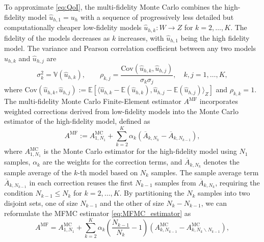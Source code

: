 To approximate \eqref{eq:QoI}, the multi-fidelity Monte Carlo combines the high-fidelity model $\widehat u_{h,1}=u_{h}$ with a sequence of progressively less detailed but computationally cheaper low-fidelity models $\widehat u_{h,k}: W \rightarrow Z$ for $k=2,\ldots,K$. The fidelity of the models decreases as $k$ increases, with $\widehat u_{h,1}$ being the high fidelity model. The variance and Pearson correlation coefficient between any two models $\widehat u_{h,k}$ and $\widehat u_{h,j}$ are
%
\begin{equation*}
    \sigma_k^2 = \mathbb{V}\left(\widehat u_{h,k}\right),\qquad \rho_{k,j} = \frac{\text{Cov}\left(\widehat u_{h,k},\widehat u_{h,j}\right)}{\sigma_k\sigma_j}, \quad k,j=1,\dots, K,
\end{equation*}
%
where $\text{Cov}(\widehat u_{h,k},\widehat u_{h,j}) := \mathbb{E}[\langle \widehat u_{h,k} - \mathbb{E}(\widehat u_{h,k}), \widehat u_{h,j} - \mathbb{E}(\widehat u_{h,j})\rangle_Z]$ and $\rho_{k,k}=1$.
The multi-fidelity Monte Carlo Finite-Element estimator $A^{\text{MF}}$ incorporates weighted corrections derived from low-fidelity models into the  Monte Carlo estimator of the high-fidelity model, defined as
%
\begin{equation}\label{eq:MFMC_estimator}
    A^{\text{MF}} := A^{\text{MC}}_{1,N_1} + \sum_{k=2}^K \alpha_k\left(\overline{A}_{k,N_k} - \overline{A}_{k,N_{k-1}} \right),
\end{equation}
%
where $A^{\text{MC}}_{1,N_1} $ is the Monte Carlo estimator for the high-fidelity model using $N_1$ samples, $\alpha_k$ are the weights for the correction terms, and $\overline{A}_{k,N_k}$ denotes the sample average of the $k$-th model based on $N_k$ samples. The sample average term $\overline{A}_{k,N_{k-1}}$ in each correction reuses the first $N_{k-1}$ samples from $\overline{A}_{k,N_{k}}$, requiring the condition $N_{k-1}\le N_k$ for $k=2,\ldots, K$. By partitioning the $N_k$ samples into two disjoint sets, one of size $N_{k-1}$ and the other of size $N_k - N_{k-1}$, we can reformulate the MFMC estimator \eqref{eq:MFMC_estimator} as
%
\begin{equation}\label{eq:MFMC_estimator_independent}
    A^{\text{MF}} = A^{\text{MC}}_{1,N_1} +  \sum_{k=2}^K \alpha_k\left(\frac{N_{k-1}}{N_{k}}-1\right)\left(A_{k,N_{k-1}}^{\text{MC}}- A_{k,N_k\backslash N_{k-1}}^{\text{MC}}\right),
\end{equation}
